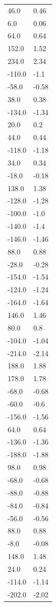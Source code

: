 \begin{longtable}{ll}
46.0 & 0.46 \\
6.0 & 0.06 \\
64.0 & 0.64 \\
152.0 & 1.52 \\
234.0 & 2.34 \\
-110.0 & -1.1 \\
-58.0 & -0.58 \\
38.0 & 0.38 \\
-134.0 & -1.34 \\
20.0 & 0.2 \\
44.0 & 0.44 \\
-118.0 & -1.18 \\
34.0 & 0.34 \\
-18.0 & -0.18 \\
138.0 & 1.38 \\
-128.0 & -1.28 \\
-100.0 & -1.0 \\
-140.0 & -1.4 \\
-146.0 & -1.46 \\
88.0 & 0.88 \\
-28.0 & -0.28 \\
-154.0 & -1.54 \\
-124.0 & -1.24 \\
-164.0 & -1.64 \\
146.0 & 1.46 \\
80.0 & 0.8 \\
-104.0 & -1.04 \\
-214.0 & -2.14 \\
188.0 & 1.88 \\
178.0 & 1.78 \\
-68.0 & -0.68 \\
-60.0 & -0.6 \\
-156.0 & -1.56 \\
64.0 & 0.64 \\
-136.0 & -1.36 \\
-188.0 & -1.88 \\
98.0 & 0.98 \\
-68.0 & -0.68 \\
-88.0 & -0.88 \\
-84.0 & -0.84 \\
-56.0 & -0.56 \\
88.0 & 0.88 \\
-8.0 & -0.08 \\
148.0 & 1.48 \\
24.0 & 0.24 \\
-114.0 & -1.14 \\
-202.0 & -2.02 \\

\end{longtable}
